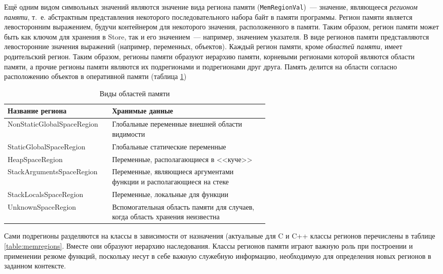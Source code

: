 Ещё одним видом символьных значений являются значение вида региона памяти (\texttt{MemRegionVal})~--- значение, являющееся \textit{регионом памяти}, т.~е. абстрактным представления некоторого последовательного набора байт в памяти программы. Регион памяти является левосторонним выражением, будучи контейнером для некоторого значения, расположенного в памяти. Таким образом, регион памяти может быть как ключом для хранения в Store, так и его значением~--- например, значением указателя. В виде регионов памяти представляются левосторонние значения выражений (например, переменных, объектов). Каждый регион памяти, кроме \textit{областей памяти}, имеет родительский регион. Таким образом, регионы памяти образуют иерархию памяти, корневыми регионами которой являются области памяти, а прочие регионы памяти являются их подрегионами и подрегионами друг друга. Память делится на области согласно расположению объектов в оперативной памяти (таблица \ref{table:regionspace})

\renewcommand\arraystretch{1.2}

\begin{table} [htbp]
  \centering
  \parbox{15cm}{\caption{Виды областей памяти}\label{table:regionspace}}
  \begin{tabular}{| l || p{0.6\linewidth} |}
  \hline
  \hline
  Название региона   & Хранимые данные \\
  \hline
  NonStaticGlobalSpaceRegion   & Глобальные переменные внешней области видимости  \\
  \hline
  StaticGlobalSpaceRegion      & Глобальные статические переменные    \\
  \hline
  HeapSpaceRegion  & Переменные, располагающиеся в <<куче>>    \\
  \hline
  StackArgumentsSpaceRegion & Переменные, являющиеся аргументами функции и располагающиеся на стеке   \\
  \hline
  StackLocalsSpaceRegion & Переменные, локальные для функции   \\
  \hline
  UnknownSpaceRegion & Вспомогательная область памяти для случаев, когда область хранения неизвестна \\
  \hline
  \hline
  \end{tabular}
\end{table}

Сами подрегионы разделяются на классы в зависимости от назначения (актуальные для C и C++ классы регионов перечислены в таблице \ref{table:memregions}. Вместе они образуют иерархию наследования. Классы регионов памяти играют важную роль при построении и применении резюме функций, поскольку несут в себе важную служебную информацию, необходимую для определения новых регионов в заданном контексте.


